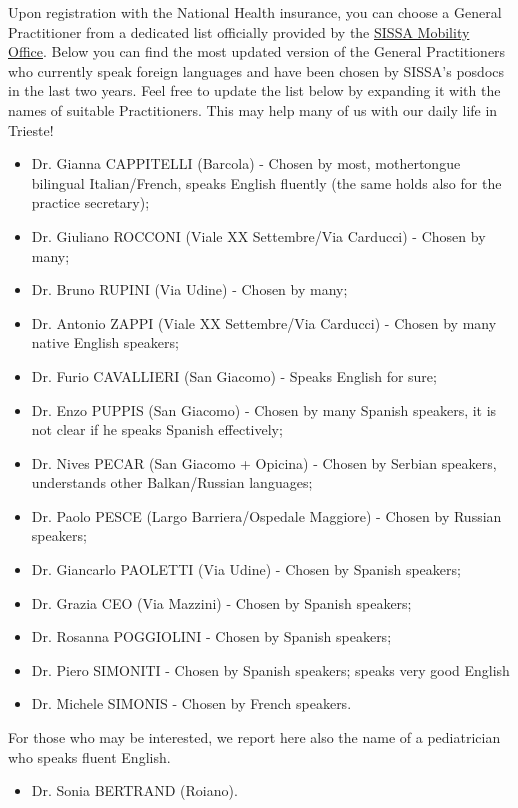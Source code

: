 \documentclass{sissavademecum}
\begin{document}
Upon registration with the National Health insurance, you can choose a General Practitioner from a dedicated list officially provided by the \href{mobility@sissa.it}{SISSA Mobility Office}. Below you can find the most updated version of the General Practitioners who currently speak foreign languages and have been chosen by SISSA's posdocs in the last two years. Feel free to update the list below by expanding it with the names of suitable Practitioners. This may help many of us with our daily life in Trieste!
\begin{itemize}
    \item Dr. Gianna CAPPITELLI (Barcola) - Chosen by most, mothertongue bilingual Italian/French, speaks English fluently (the same holds also for the practice secretary);
    \item Dr. Giuliano ROCCONI (Viale XX Settembre/Via Carducci) - Chosen by many;
    \item Dr. Bruno RUPINI (Via Udine) - Chosen by many;
    \item Dr. Antonio ZAPPI (Viale XX Settembre/Via Carducci) - Chosen by many native English speakers;
    \item Dr. Furio CAVALLIERI (San Giacomo) - Speaks English for sure;
    \item Dr. Enzo PUPPIS (San Giacomo) - Chosen by many Spanish speakers, it is not clear if he speaks Spanish effectively;
    \item Dr. Nives PECAR (San Giacomo + Opicina) - Chosen by Serbian speakers, understands other Balkan/Russian languages;
    \item Dr. Paolo PESCE (Largo Barriera/Ospedale Maggiore) - Chosen by Russian speakers;
    \item Dr. Giancarlo PAOLETTI (Via Udine) - Chosen by Spanish speakers;
    \item Dr. Grazia CEO (Via Mazzini) - Chosen by Spanish speakers;
    \item Dr. Rosanna POGGIOLINI - Chosen by Spanish speakers;
    \item Dr. Piero SIMONITI - Chosen by Spanish speakers; speaks very good English
    \item Dr. Michele SIMONIS - Chosen by French speakers.
\end{itemize}
For those who may be interested, we report here also the name of a pediatrician who speaks fluent English.
\begin{itemize}
    \item Dr. Sonia BERTRAND (Roiano).
\end{itemize}
\end{document}
